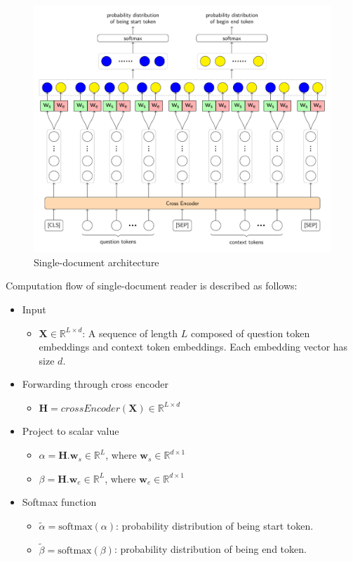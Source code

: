 \documentclass[12pt, sort&compress]{report}
\begin{document}
\begin{figure}[!htbp]
	\centering
	\includegraphics[scale=.7]{images/PDF/singleDocReader/singleDocReader.pdf}
	\caption{Single-document architecture}
	\label{fig:08}
\end{figure}
\par Computation flow of single-document reader is described as follows:
\begin{itemize}
	\item Input
	\begin{itemize}
		\item $\mathbf{X} \in \mathbb{R}^{L \times d}$: A sequence of length $L$ composed of question token embeddings and context token embeddings. Each embedding vector has size $d$.
	\end{itemize}
	\item Forwarding through cross encoder
	\begin{itemize}
		\item $\mathbf{H} = crossEncoder\left(\mathbf{X}\right) \in \mathbb{R}^{L \times d}$
	\end{itemize}
	\item Project to scalar value
	\begin{itemize}
		\item $\alpha = \mathbf{H}.\mathbf{w}_s \in \mathbb{R}^{L}$, where $\mathbf{w}_s \in \mathbb{R}^{d \times 1}$
		\item $\beta = \mathbf{H}.\mathbf{w}_e \in \mathbb{R}^{L}$, where $\mathbf{w}_e \in \mathbb{R}^{d \times 1}$
	\end{itemize}
	\item Softmax function
	\begin{itemize}
		\item $\tilde{\alpha} = \text{softmax}(\alpha)$: probability distribution of being start token.
		\item $\tilde{\beta} = \text{softmax}(\beta)$: probability distribution of being end token.
	\end{itemize}
\end{itemize}
\end{document}
